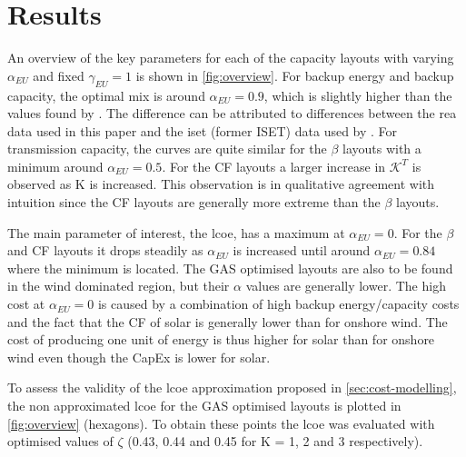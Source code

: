 \documentclass[a4paper, 5p, sort&compress]{elsarticle}%
\begin{document}

\section{Results}
\label{sec:results}

An overview of the key parameters for each of the capacity layouts
with varying $\alpha_{EU}$ and fixed $\gamma_{EU} = 1 $
is shown in \cref{fig:overview}. For
backup energy and backup capacity, the optimal mix is around
$\alpha_{EU} = 0.9$, which is slightly higher than the values found by
\cite{Heide2010,Heide2011}.
The difference can be attributed to differences between the \gls{rea} data used in this paper
and the \gls{iset} (former ISET) data \cite{iset} used by \cite{Heide2010,Heide2011}. For
transmission capacity, the curves are quite similar for the $\beta$
layouts with a minimum around $\alpha_{EU} = 0.5$.
For the CF layouts a larger increase in $\mathcal{K}^{T}$
is observed as K is increased. This observation is in qualitative agreement with intuition
since the CF layouts are generally more extreme than the $\beta$
layouts. %


The main parameter of interest, the \gls{lcoe}, has a maximum at
$\alpha_{EU} = 0$. For the $\beta$ and CF layouts it drops steadily as
$\alpha_{EU}$ is increased until around $\alpha_{EU} = 0.84$ where the minimum
is located. The GAS optimised layouts are also to be found in the wind
dominated region, but their $\alpha$ values are generally lower. The high
cost at $\alpha_{EU} = 0$ is caused by a combination of high backup
energy/capacity costs and the fact that the CF of solar is generally
lower than for onshore wind. The cost of producing one unit of energy
is thus higher for solar than for onshore wind even though the
\gls{CapEx} is lower for solar.

To assess the validity of the \gls{lcoe} approximation proposed in
\cref{sec:cost-modelling}, the non approximated \gls{lcoe} for the GAS
optimised layouts is plotted in \cref{fig:overview} (hexagons). To
obtain these points the \gls{lcoe} was evaluated with optimised values of
$\zeta$ (0.43, 0.44 and 0.45 for K = 1, 2 and 3 respectively).
\end{document}
